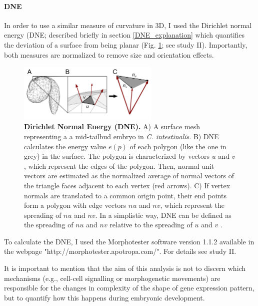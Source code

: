 \paragraph{DNE}
In order to use a similar measure of curvature in 3D, I used the Dirichlet normal energy (DNE; described briefly in section \ref{DNE_explanation} which quantifies the deviation of a surface from being planar (Fig. \ref{fig:DNE}; see study II). 
Importantly, both measures are normalized to remove size and orientation effects.

\begin{figure}[h]
  \includegraphics[width=0.6\textwidth]{./Images/DNE.png}
  \centering
  \caption{\textbf{Dirichlet Normal Energy (DNE).} A) A surface mesh representing a a mid-tailbud embryo in \textit{C. intestinalis}. B) DNE calculates the energy value $e(p)$ of each polygon (like the one in grey) in the surface. The polygon is characterized by vectors $u$ and $v$, which represent the edges of the polygon. Then, normal unit vectors are estimated as the normalized average of normal vectors of the triangle faces adjacent to each vertex (red arrows). C) If vertex normals are translated to a common origin point, their end points form a polygon with edge vectors $nu$ and $nv$, which represent the spreading of $nu$ and $nv$. In a simplistic way, DNE can be defined as the spreading of $nu$ and $nv$ relative to the spreading of $u$ and $v$  \citep{Bunn2011,Winchester2016}.
 }
  \label{fig:DNE}
\end{figure}

To calculate the DNE, I used the Morphotester software version 1.1.2 \citep{Winchester2016}
available in the webpage "http://morphotester.apotropa.com/". For details see study II.

It is important to mention that the aim of this analysis is not to discern which mechanisms (e.g., cell-cell signalling or morphogenetic movements) are responsible for the changes in complexity of the shape of gene expression pattern, but to quantify how this happens during embryonic development.


